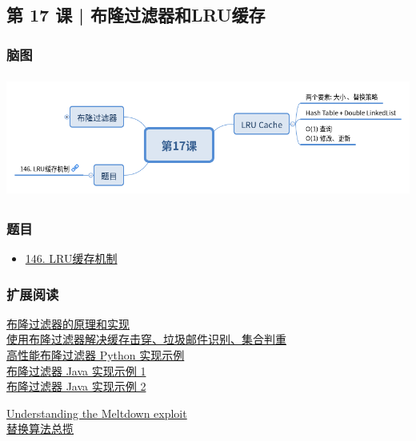 \subsection{第 17 课 | 布隆过滤器和LRU缓存}

\subsubsection{脑图}

\includegraphics[width=150mm,height=40mm]{images/camp/第17课.png}

\subsubsection{题目}

\begin{itemize}
  \item \hyperref[leetcode:146]{146. LRU缓存机制}
\end{itemize}

\subsubsection{扩展阅读}

\href{https://www.cnblogs.com/cpselvis/p/6265825.html}{布隆过滤器的原理和实现} \\
\href{https://blog.csdn.net/tianyaleixiaowu/article/details/74721877}{使用布隆过滤器解决缓存击穿、垃圾邮件识别、集合判重} \\
\href{https://github.com/jhgg/pybloof}{高性能布隆过滤器 Python 实现示例} \\
\href{https://github.com/lovasoa/bloomfilter/blob/master/src/main/java/BloomFilter.java}{布隆过滤器 Java 实现示例 1} \\
\href{https://github.com/Baqend/Orestes-Bloomfilter}{布隆过滤器 Java 实现示例 2}

\href{https://www.sqlpassion.at/archive/2018/01/06/understanding-the-meltdown-exploit-in-my-own-simple-words/}{Understanding the Meltdown exploit} \\
\href{https://en.wikipedia.org/wiki/Cache_replacement_policies}{替换算法总揽} \\
